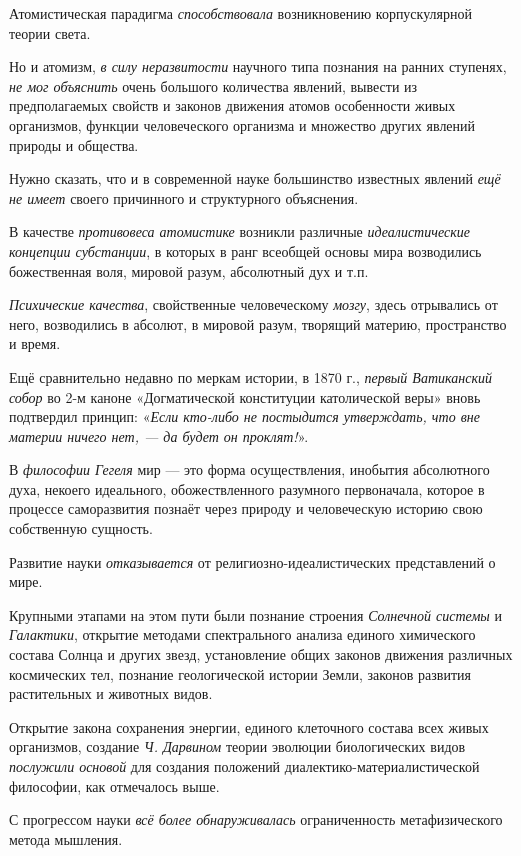 \documentclass[a4paper,14pt,russian]{extreport}
\begin{document}
Атомистическая парадигма \emph{способствовала} возникновению корпускулярной теории света.

Но и атомизм, \emph{в силу неразвитости} научного типа познания на ранних ступенях, \emph{не мог объяснить} очень большого количества явлений, вывести из предполагаемых свойств и законов движения атомов особенности живых организмов, функции человеческого организма и множество других явлений природы и общества.

Нужно сказать, что и в современной науке большинство известных явлений \emph{ещё не имеет} своего причинного и структурного объяснения.

В качестве \emph{противовеса атомистике} возникли различные \emph{идеалистические концепции субстанции}, в которых в ранг всеобщей основы мира возводились божественная воля, мировой разум, абсолютный дух и т.п.

\emph{Психические качества}, свойственные человеческому \emph{мозгу}, здесь отрывались от него, возводились в абсолют, в мировой разум, творящий материю, пространство и время.

Ещё сравнительно недавно по меркам истории, в 1870 г., \emph{первый Ватиканский собор} во 2-м каноне «Догматической конституции католической веры» вновь подтвердил принцип: «\emph{Если кто-либо не постыдится утверждать, что вне материи ничего нет, --- да будет он проклят!}».

В \emph{философии Гегеля} мир --- это форма осуществления, инобытия абсолютного духа, некоего идеального, обожествленного разумного первоначала, которое в процессе саморазвития познаёт через природу и человеческую историю свою собственную сущность.

Развитие науки \emph{отказывается} от религиозно-идеалистических представлений о мире.

Крупными этапами на этом пути были познание строения \emph{Солнечной системы} и \emph{Галактики}, открытие методами спектрального анализа единого химического состава Солнца и других звезд, установление общих законов движения различных космических тел, познание геологической истории Земли, законов развития растительных и животных видов.

Открытие закона сохранения энергии, единого клеточного состава всех живых организмов, создание \emph{Ч. Дарвином} теории эволюции биологических видов \emph{послужили основой} для создания положений диалектико-материалистической философии, как отмечалось выше.

С прогрессом науки \emph{всё более обнаруживалась} ограниченност\emph{ь} метафизического метода мышления.
\end{document}
